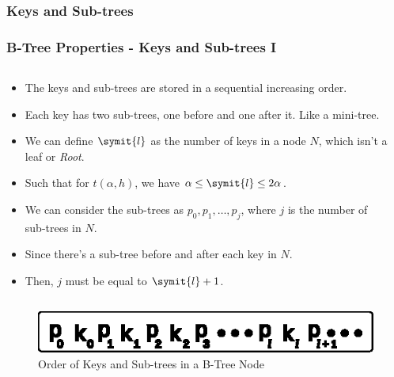 \documentclass{beamer}
\begin{document}
\begin{frame}
    \subsubsection{Keys and Sub-trees}
    \frametitle{B-Tree Properties - Keys and Sub-trees I}
    \begin{columns}
        \begin{column}{\textlecolumn}
            \begin{block}{}
                \vspace{-0.75cm}
                \begin{itemize}
                    \item The keys and sub-trees are stored in a sequential increasing order.
                    \item Each key has two sub-trees, one before and one after it. Like a mini-tree.
                    \item We can define \(\symit{l}\) as the number of keys in a node \(N\), which isn't a leaf or \emph{Root}.
                    \item Such that for \(t\left(\alpha, h\right)\), we have \(\alpha \leq \symit{l} \leq 2\alpha\).
                    \item We can consider the sub-trees as \(p_0, p_1, \ldots, p_j\), where \(j\) is the number of sub-trees in \(N\).
                    \item Since there's a sub-tree before and after each key in \(N\).
                    \item Then, \(j\) must be equal to \(\symit{l} + 1\).
                \end{itemize}
            \end{block}
        \end{column}
        \begin{column}{\textricolumn}
            \begin{block}{}
            \end{block}
        \end{column}
    \end{columns}
    \begin{figure}[h!]
        \includegraphics[width=0.85\linewidth]{resources/made/key_subtree_order.eps}
        \caption{Order of Keys and Sub-trees in a B-Tree Node}
    \end{figure}
\end{frame}
\end{document}
